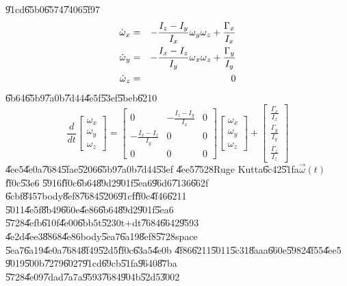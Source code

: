 \documentclass[12pt]{article}
\begin{document}
\U{91cd}\U{65b0}\U{6574}\U{7406}\U{5f97}%
\begin{eqnarray}
\dot{\omega}_{x} &=&-\frac{I_{z}-I_{y}}{I_{x}}\omega _{y}\omega _{z}+\frac{%
\Gamma _{x}}{I_{x}} \\
\dot{\omega}_{y} &=&-\frac{I_{x}-I_{z}}{I_{y}}\omega _{x}\omega _{z}+\frac{%
\Gamma _{y}}{I_{y}} \\
\dot{\omega}_{z} &=&0
\end{eqnarray}%
\U{6b64}\U{65b9}\U{7a0b}\U{7d44}\U{4e5f}\U{53ef}\U{5beb}\U{6210}%
\begin{equation}
\frac{d}{dt}\left[ 
\begin{array}{c}
\omega _{x} \\ 
\omega _{y} \\ 
\omega _{z}%
\end{array}%
\right] =\left[ 
\begin{array}{ccc}
0 & -\frac{I_{z}-I_{y}}{I_{x}} & 0 \\ 
-\frac{I_{x}-I_{z}}{I_{y}} & 0 & 0 \\ 
0 & 0 & 0%
\end{array}%
\right] \left[ 
\begin{array}{c}
\omega _{x} \\ 
\omega _{y} \\ 
\omega _{z}%
\end{array}%
\right] +\left[ 
\begin{array}{c}
\frac{\Gamma _{x}}{I_{x}} \\ 
\frac{\Gamma _{y}}{I_{y}} \\ 
\frac{\Gamma _{z}}{I_{z}}%
\end{array}%
\right] 
\end{equation}%
\U{4ee5}\U{4e0a}\U{7684}\U{5fae}\U{5206}\U{65b9}\U{7a0b}\U{7d44}\U{53ef}%
\U{4ee5}\U{7528}Ruge Kutta\U{6c42}\U{51fa}$\vec{\omega}(t)$\U{ff0c}\U{53e6}%
\U{5916}\U{ff0c}\U{6b64}\U{89d2}\U{901f}\U{5ea6}\U{96d6}\U{7136}\U{662f}%
\U{6cbf}\U{8457}body\U{8ef8}\U{7684}\U{5206}\U{91cf}\U{ff0c}\U{4f46}\U{6211}%
\U{5011}\U{4e5f}\U{8b49}\U{660e}\U{4e86}\U{6b64}\U{89d2}\U{901f}\U{5ea6}%
\U{5728}\U{4efb}\U{610f}\U{4e00}\U{6bb5}t\U{5230}t+dt\U{7684}\U{6642}\U{9593}%
\U{4e2d}\U{4ee3}\U{8868}\U{4e86}body\U{5ea7}\U{6a19}\U{8ef8}\U{5728}space%
\U{5ea7}\U{6a19}\U{4e0a}\U{7684}\U{8f49}\U{52d5}\U{ff0c}\U{63a5}\U{4e0b}%
\U{4f86}\U{6211}\U{5011}\U{5c31}\U{8aaa}\U{660e}\U{5982}\U{4f55}\U{4ee5}%
\U{9019}\U{500b}\U{7279}\U{6027}\U{91cd}\U{69cb}\U{51fa}\U{9640}\U{87ba}%
\U{5728}\U{4e09}\U{7dad}\U{7a7a}\U{9593}\U{7684}\U{904b}\U{52d5}\U{3002}%
\bigskip 
\end{document}
